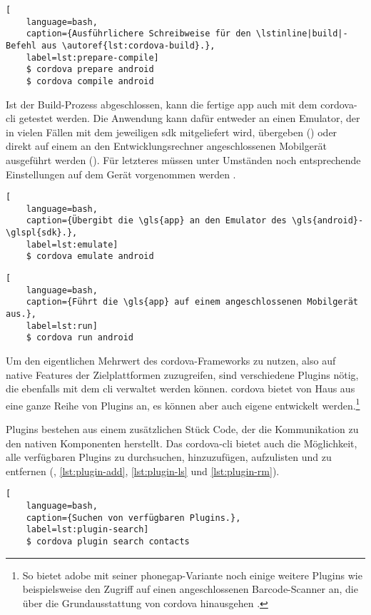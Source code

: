 {\begin{lstlisting}[
	language=bash,
	caption={Ausführlichere Schreibweise für den \lstinline|build|-Befehl aus \autoref{lst:cordova-build}.},
	label=lst:prepare-compile]
	$ cordova prepare android
	$ cordova compile android
\end{lstlisting}


Ist der Build-Prozess abgeschlossen, kann die fertige \gls{app} auch mit dem \gls{cordova}-\gls{cli} getestet werden. 
Die Anwendung kann dafür entweder an einen Emulator, der in vielen Fällen mit dem jeweiligen \gls{sdk} mitgeliefert wird, übergeben () oder direkt auf einem an den Entwicklungsrechner angeschlossenen Mobilgerät ausgeführt werden ().
Für letzteres müssen unter Umständen noch entsprechende Einstellungen auf dem Gerät vorgenommen werden \cite{Cordova-Docs_CLI}.


\begin{lstlisting}[
	language=bash,
	caption={Übergibt die \gls{app} an den Emulator des \gls{android}-\glspl{sdk}.},
	label=lst:emulate]
	$ cordova emulate android
\end{lstlisting}

\begin{lstlisting}[
	language=bash,
	caption={Führt die \gls{app} auf einem angeschlossenen Mobilgerät aus.},
	label=lst:run]
	$ cordova run android
\end{lstlisting}


Um den eigentlichen Mehrwert des \gls{cordova}-Frameworks zu nutzen, also auf native Features der Zielplattformen zuzugreifen, sind verschiedene Plugins nötig, die ebenfalls mit dem \gls{cli} verwaltet werden können.
\gls{cordova} bietet von Haus aus eine ganze Reihe von Plugins an, es können aber auch eigene entwickelt werden.\footnote{So bietet \zB \gls{adobe} mit seiner \gls{phonegap}-Variante noch einige weitere Plugins wie beispielsweise den Zugriff auf einen angeschlossenen Barcode-Scanner an, die über die Grundausstattung von \gls{cordova} hinausgehen \cite{Cordova-Docs_CLI}.}

Plugins bestehen aus einem zusätzlichen Stück Code, der die Kommunikation zu den nativen Komponenten herstellt.
Das \gls{cordova}-\gls{cli} bietet auch die Möglichkeit, alle verfügbaren Plugins zu durchsuchen, hinzuzufügen, aufzulisten und zu entfernen (, \ref{lst:plugin-add}, \ref{lst:plugin-ls} und \ref{lst:plugin-rm}).


\begin{lstlisting}[
	language=bash,
	caption={Suchen von verfügbaren Plugins.},
	label=lst:plugin-search]
	$ cordova plugin search contacts
\end{lstlisting}

}
